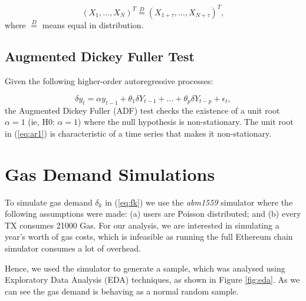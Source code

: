 \documentclass{article}
\begin{document}
 \begin{equation}
(X_{1} , ... , X_{N} )^T \stackrel{D}{=} (X_{1+\tau} , ... , X_{N+\tau} )^T,
\label{eq:ar1} 
\end{equation}
where $\stackrel{D}{=}$ means equal in distribution.

\subsection{Augmented Dickey Fuller Test}
\label{section:adf}

Given the following higher-order autoregressive processes:

\begin{equation}
\delta y_{t} = \alpha y_{t-1} + \theta_{1} \delta Y_{t-1}  + ... + \theta_{p} \delta Y_{t-p} + \epsilon_{t},
\label{eq:ar1} 
\end{equation}
the Augmented Dickey Fuller (ADF) test checks the existence of a unit root $\alpha = 1$ (ie, H0: $\alpha = 1$) where the null hypothesis is non-stationary. The unit root in (\ref{eq:ar1}) is characteristic of a time series that makes it non-stationary.


\section{Gas Demand Simulations}
\label{section:gas_demand}

To simulate gas demand $\delta_{k}$ in (\ref{eq:fk}) we use the \textit{abm1559}  simulator \cite{Mon21} where the following assumptions were made: (a) users are Poisson distributed; and (b) every TX consumes 21000 Gas. For our analysis, we are interested in simulating a year's worth of gas costs, which is infeasible as running the full Ethereum chain simulator consumes a lot of overhead.

Hence, we used the simulator to generate a sample, which was analysed using Exploratory Data Analysis (EDA) techniques, as shown in Figure \ref{fig:eda}. As we can see the gas demand is behaving as a normal random sample. 
\end{document}
